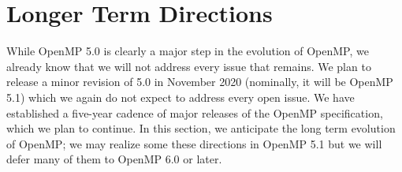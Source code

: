 \section{Longer Term Directions}
\label{sec:future_directions}

While OpenMP 5.0 is clearly a major step in the evolution of OpenMP,
we already know that we will not address every issue that remains.
We plan to release a minor revision of 5.0 in November 2020 (nominally,
it will be OpenMP 5.1) which we again do not expect to address every
open issue. We have established a five-year cadence of major releases 
of the OpenMP specification, which we plan to continue. In this section, 
we anticipate the long term evolution of OpenMP; we may realize some these 
directions in OpenMP 5.1 but we will defer many of them to OpenMP 6.0 
or later. 









